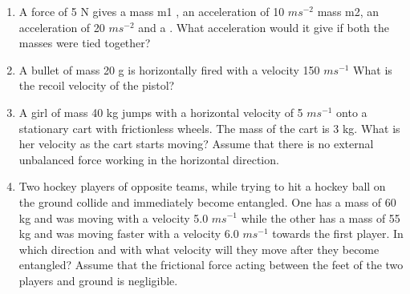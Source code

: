 \begin{enumerate}[label=\arabic*.,ref=\thesection.\theenumi]
\item A force of 5 N gives a mass m1
, an acceleration of 10 $m s^{-2}$ mass m2, an acceleration of 20 $m s^{-2}$
and a .
What acceleration would it give if both the masses were tied together?
\item A bullet of mass 20 g is horizontally fired with a velocity 150 $m s^{-1}$
What is the recoil velocity of the pistol?
\item A girl of mass 40 kg jumps with a horizontal velocity of 5 $m s^{-1}$
onto
a stationary cart with frictionless wheels. The mass of the cart is 3 kg. What is her velocity as the cart starts moving? Assume that there is no external unbalanced force working in the horizontal direction.
\item Two hockey players of opposite teams, while trying to hit a hockey ball on the ground collide and immediately become entangled. One has a mass of 60 kg and was moving with a velocity 5.0 $m s^{-1}$
while the other
has a mass of 55 kg and was moving faster with a velocity 6.0 $m s^{-1}$
towards
the first player. In which direction and with what velocity will they move after they become entangled? Assume that the frictional force acting between the feet of the two players and ground is negligible.


\end{enumerate}
